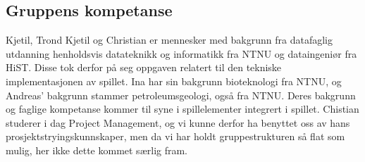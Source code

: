 \subsection{Gruppens kompetanse}

Kjetil, Trond Kjetil og Christian er mennesker med bakgrunn fra datafaglig utdanning henholdsvis datateknikk og informatikk fra NTNU og dataingeniør fra HiST. Disse tok derfor på seg oppgaven relatert til den tekniske implementasjonen av spillet.
Ina har sin bakgrunn bioteknologi fra NTNU, og Andreas' bakgrunn stammer petroleumsgeologi, også fra NTNU.
Deres bakgrunn og faglige kompetanse kommer til syne i spillelementer integrert i spillet.
Chistian studerer i dag Project Management, og vi kunne derfor ha benyttet oss av hans prosjektstryingskunnskaper, men da vi har holdt gruppestrukturen så flat som mulig, her ikke dette kommet særlig fram.
